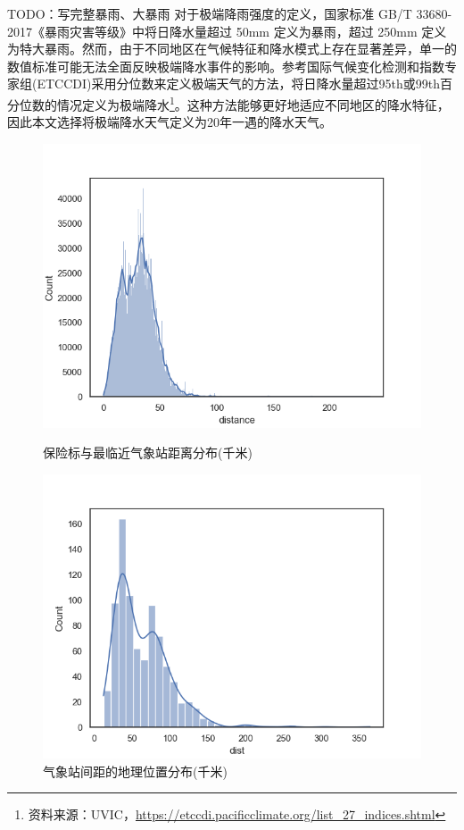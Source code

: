TODO：写完整暴雨、大暴雨
对于极端降雨强度的定义，国家标准 GB/T 33680-2017《暴雨灾害等级》中将日降水量超过 50mm 定义为暴雨，超过 250mm 定义为特大暴雨。然而，由于不同地区在气候特征和降水模式上存在显著差异，单一的数值标准可能无法全面反映极端降水事件的影响。参考国际气候变化检测和指数专家组(ETCCDI)采用分位数来定义极端天气的方法，将日降水量超过95th或99th百分位数的情况定义为极端降水\footnote{资料来源：UVIC，\url{https://etccdi.pacificclimate.org/list_27_indices.shtml}}。这种方法能够更好地适应不同地区的降水特征\citep{karl1999clivar}，因此本文选择将极端降水天气定义为20年一遇的降水天气。
\begin{figure}[H]
    \begin{minipage}{0.48\linewidth}
        \centering
        \includegraphics[width=\textwidth]{lib/img/distance.png}
        \caption{保险标与最临近气象站距离分布(千米)}
        \label{fig:distance}
    \end{minipage}
    \begin{minipage}{0.48\linewidth}
        \centering
        \includegraphics[width=\textwidth]{lib/img/locations_distance.png}
        \caption{气象站间距的地理位置分布(千米)}
        \label{fig:locations}
    \end{minipage}
\end{figure}

